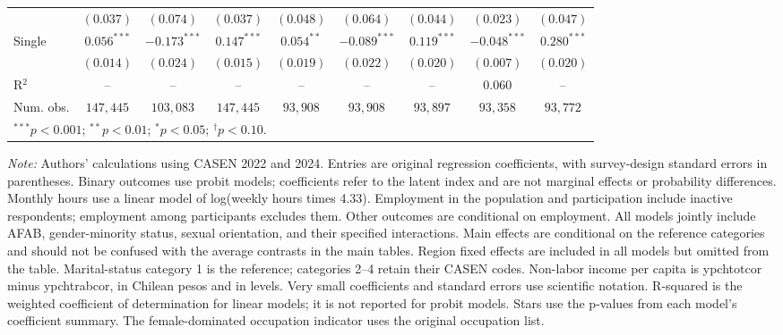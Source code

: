 \begin{table}[htpb]
{\begin{tabular}{l c c c c c c c c}
 & $(0.037)$ & $(0.074)$ & $(0.037)$ & $(0.048)$ & $(0.064)$ & $(0.044)$ & $(0.023)$ & $(0.047)$ \\
Single & $0.056^{***}$ & $-0.173^{***}$ & $0.147^{***}$ & $0.054^{**}$ & $-0.089^{***}$ & $0.119^{***}$ & $-0.048^{***}$ & $0.280^{***}$ \\
 & $(0.014)$ & $(0.024)$ & $(0.015)$ & $(0.019)$ & $(0.022)$ & $(0.020)$ & $(0.007)$ & $(0.020)$ \\
\hline
R$^2$ & -- & -- & -- & -- & -- & -- & $0.060$ & -- \\
Num. obs. & $147,445$ & $103,083$ & $147,445$ & $93,908$ & $93,908$ & $93,897$ & $93,358$ & $93,772$ \\
\hline
\multicolumn{9}{l}{\scriptsize $^{***}p<0.001$; $^{**}p<0.01$; $^{*}p<0.05$; $^{\dagger}p<0.10$.} \\
\end{tabular}%
}
\par\smallskip
\begin{minipage}{\textwidth}\footnotesize\raggedright
\textit{Note:} Authors' calculations using CASEN 2022 and 2024. Entries are original regression coefficients, with survey-design standard errors in parentheses. Binary outcomes use probit models; coefficients refer to the latent index and are not marginal effects or probability differences. Monthly hours use a linear model of log(weekly hours times 4.33). Employment in the population and participation include inactive respondents; employment among participants excludes them. Other outcomes are conditional on employment. All models jointly include AFAB, gender-minority status, sexual orientation, and their specified interactions. Main effects are conditional on the reference categories and should not be confused with the average contrasts in the main tables. Region fixed effects are included in all models but omitted from the table. Marital-status category 1 is the reference; categories 2--4 retain their CASEN codes. Non-labor income per capita is ypchtotcor minus ypchtrabcor, in Chilean pesos and in levels. Very small coefficients and standard errors use scientific notation. R-squared is the weighted coefficient of determination for linear models; it is not reported for probit models. Stars use the p-values from each model's coefficient summary. The female-dominated occupation indicator uses the original occupation list.
\end{minipage}
\end{table}
